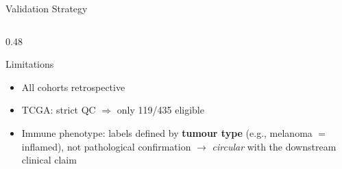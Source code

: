 \documentclass[aspectratio=1610]{beamer}
\begin{document}
\begin{frame}{Validation Strategy}
\begin{columns}[T]
\begin{column}{0.48\textwidth}
            \begin{alertblock}{Limitations}
                \begin{itemize}
                    \item All cohorts retrospective
                    \item TCGA: strict QC $\Rightarrow$ only 119/435 eligible
                    \item Immune phenotype: labels defined by \textbf{tumour type} (e.g., melanoma $=$ inflamed), not pathological confirmation $\rightarrow$ \textit{circular} with the downstream clinical claim
                \end{itemize}
            \end{alertblock}
        \end{column}
    \end{columns}
\end{frame}
\end{document}
